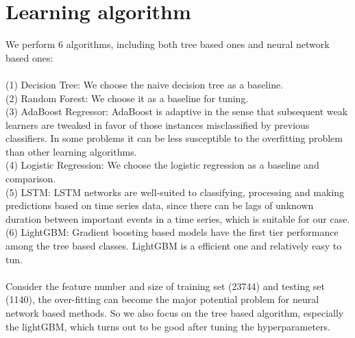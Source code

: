 \documentclass{article}
\begin{document}
\section{Learning algorithm}
We perform 6 algorithms, including both tree based ones and neural network based ones:\\\\
(1) Decision Tree:  We choose the naive decision tree as a baseline.\\
(2) Random Forest:  We choose it as a baseline for tuning.\\
(3) AdaBoost Regressor:  AdaBoost is adaptive in the sense that subsequent weak learners are tweaked in favor of those instances misclassified by previous classifiers. In some problems it can be less susceptible to the overfitting problem than other learning algorithms.\\
(4) Logistic Regression:  We choose the logistic regression as a baseline and comparison.\\
(5) LSTM:  LSTM networks are well-suited to classifying, processing and making predictions based on time series data, since there can be lags of unknown duration between important events in a time series, which is suitable for our case.\\
(6) LightGBM:  Gradient boosting based models have the first tier performance among the tree based classes. LightGBM is a efficient one and relatively easy to tun.\\\\
Consider the feature number and size of training set (23744) and testing set (1140), the over-fitting can become the major potential problem for neural network based methods. So we also focus on the tree based algorithm, especially the lightGBM, which turns out to be good after tuning the hyperparameters.
\end{document}
